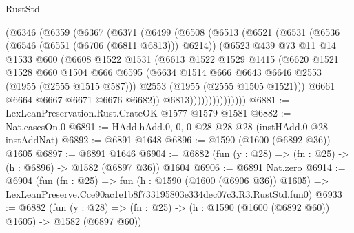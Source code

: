 \begin{lexlean}{RustStd}
\begin{coremodule}
              (@6346
                (@6359
                  (@6367
                    (@6371
                      (@6499
                        (@6508
                          (@6513
                            (@6521
                              (@6531
                                (@6536 (@6546 (@6551 (@6706 (@6811 @6813))) @6214))
                                (@6523
                                  @439
                                  @73
                                  @11
                                  @14
                                  @1533
                                  @600
                                  (@6608
                                    @1522
                                    @1531
                                    (@6613
                                      @1522
                                      @1529
                                      @1415
                                      (@6620
                                        @1521
                                        @1528
                                        @660
                                        @1504
                                        @666
                                        @6595
                                        (@6634
                                          @1514
                                          @666
                                          @6643
                                          @6646
                                          @2553
                                          (@1955 (@2555 @1515 @587)))
                                        @2553
                                        (@1955 (@2555 @1505 @1521)))
                                      @6661
                                      @6664
                                      @6667
                                      @6671
                                      @6676
                                      @6682))
                                  @6813)))))))))))))))
@6881 := LexLeanPreservation.Rust.CrateOK @1577 @1579 @1581
@6882 := Nat.casesOn.{0}
@6891 := HAdd.hAdd.{0, 0, 0} @28 @28 @28 (instHAdd.{0} @28 instAddNat)
@6892 := @6891 @1648
@6896 := @1590 (@1600 (@6892 @36)) @1605
@6897 := @6891 @1646
@6904 := @6882 (fun (y : @28) => (fn : @25) -> (h : @6896) -> @1582 (@6897 @36)) @1604
@6906 := @6891 Nat.zero
@6914 := @6904
    (fun (fn : @25) =>
    fun (h : @1590 (@1600 (@6906 @36)) @1605) =>
    LexLeanPreserve.Cce90ac1e1b8f733195803e334dec07c3.R3.RustStd.fun0)
@6933 := @6882
    (fun (y : @28) => (fn : @25) -> (h : @1590 (@1600 (@6892 @60)) @1605) -> @1582 (@6897 @60))

\end{coremodule}
\end{lexlean}
